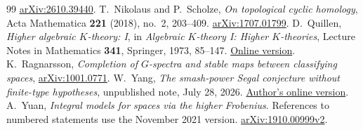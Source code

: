 \documentclass[11pt,a4paper]{article}
\theoremstyle{definition}
\begin{document}
\begin{thebibliography}{99}
\href{https://arxiv.org/abs/2610.39440}{arXiv:2610.39440}.
 T.~Nikolaus and P.~Scholze,
\emph{On topological cyclic homology},
Acta Mathematica \textbf{221} (2018), no.~2, 203--409.
\href{https://arxiv.org/abs/1707.01799}{arXiv:1707.01799}.
 D.~Quillen,
\emph{Higher algebraic $K$-theory: I},
in \emph{Algebraic $K$-theory I: Higher $K$-theories},
Lecture Notes in Mathematics \textbf{341}, Springer, 1973, 85--147.
\href{https://www.sas.rochester.edu/mth/sites/doug-ravenel/otherpapers/Quillen-Higher-I.pdf}{Online version}.
 K.~Ragnarsson,
\emph{Completion of $G$-spectra and stable maps between classifying spaces},
\href{https://arxiv.org/abs/1001.0771}{arXiv:1001.0771}.
 W.~Yang,
\emph{The smash-power Segal conjecture without finite-type hypotheses},
unpublished note, July 28, 2026.
\href{https://wei-yang-math.github.io/notes/smash-power-segal-conjecture-without-finite-type-hypotheses.pdf}{Author's online version}.
 A.~Yuan,
\emph{Integral models for spaces via the higher Frobenius}.
References to numbered statements use the November 2021 version.
\href{https://arxiv.org/abs/1910.00999v2}{arXiv:1910.00999v2}.
\end{thebibliography}
\end{document}
